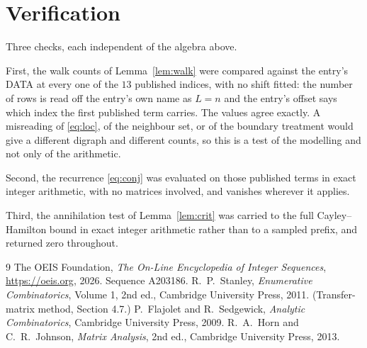 \documentclass[11pt,a4paper]{article}
\theoremstyle{plain}
\theoremstyle{definition}
\begin{document}
\section{Verification}

Three checks, each independent of the algebra above.

First, the walk counts of Lemma~\ref{lem:walk} were compared against the entry's DATA at
every one of the $13$ published indices, with no shift fitted: the number of rows is
read off the entry's own name as $L=n$ and the entry's offset says which index the first
published term carries. The values agree exactly. A misreading of \eqref{eq:loc}, of the
neighbour set, or of the boundary treatment would give a different digraph and different
counts, so this is a test of the modelling and not only of the arithmetic.

Second, the recurrence \eqref{eq:conj} was evaluated on those published terms in exact
integer arithmetic, with no matrices involved, and vanishes wherever it applies.

Third, the annihilation test of Lemma~\ref{lem:crit} was carried to the full
Cayley--Hamilton bound in exact integer arithmetic rather than to a sampled prefix, and
returned zero throughout.

\begin{thebibliography}{9}
 The OEIS Foundation, \emph{The On-Line Encyclopedia of Integer
Sequences}, \url{https://oeis.org}, 2026. Sequence A203186.
 R.~P.~Stanley, \emph{Enumerative Combinatorics}, Volume 1, 2nd ed.,
Cambridge University Press, 2011. (Transfer-matrix method, Section 4.7.)
 P.~Flajolet and R.~Sedgewick, \emph{Analytic Combinatorics}, Cambridge
University Press, 2009.
 R.~A.~Horn and C.~R.~Johnson, \emph{Matrix Analysis}, 2nd ed., Cambridge
University Press, 2013.
\end{thebibliography}
\end{document}
